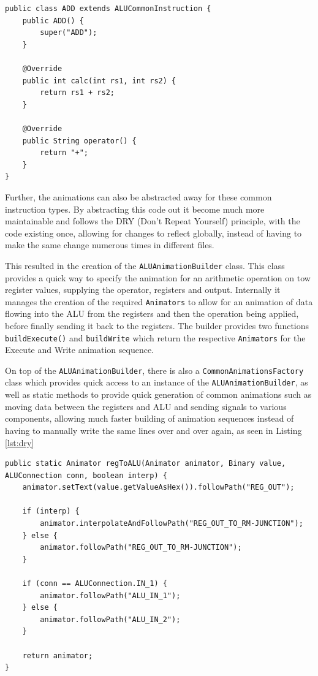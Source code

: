 \begin{lstlisting}[caption={ADD Insutrction, making useof the \texttt{ALUCommonInstruction} class}, label=lst:add_subclass]
public class ADD extends ALUCommonInstruction {
    public ADD() {
        super("ADD");
    }

    @Override
    public int calc(int rs1, int rs2) {
        return rs1 + rs2;
    }

    @Override
    public String operator() {
        return "+";
    }
}
\end{lstlisting}

Further, the animations can also be abstracted away for these common instruction types. By abstracting this code out it become much more maintainable and follows the DRY (Don't Repeat Yourself) principle, with the code existing once, allowing for changes to reflect globally, instead of having to make the same change numerous times in different files.

This resulted in the creation of the \texttt{ALUAnimationBuilder} class.  This class provides a quick way to specify the animation for an arithmetic operation on tow register values, supplying the operator, registers and output. Internally it manages the creation of the required \texttt{Animators} to allow for an animation of data flowing into the \ac{ALU} from the registers and then the operation being applied, before finally sending it back to the registers. The builder provides two functions \verb|buildExecute()| and \verb|buildWrite| which return the respective \texttt{Animators} for the Execute and Write animation sequence. 

On top of the \texttt{ALUAnimationBuilder}, there is also a \texttt{CommonAnimationsFactory} class which provides quick access to an instance of the \texttt{ALUAnimationBuilder}, as well as static methods to provide quick generation of common animations such as moving data between the registers and \ac{ALU} and sending signals to various components, allowing much faster building of animation sequences instead of having to manually write the same lines over and over again, as seen in Listing \ref{lst:dry}

\begin{lstlisting}[caption=Factory method building a more complex animation moving data from the registers to the \ac{ALU},label=lst:dry]
public static Animator regToALU(Animator animator, Binary value, ALUConnection conn, boolean interp) {
    animator.setText(value.getValueAsHex()).followPath("REG_OUT");

    if (interp) {
        animator.interpolateAndFollowPath("REG_OUT_TO_RM-JUNCTION");
    } else {
        animator.followPath("REG_OUT_TO_RM-JUNCTION");
    }

    if (conn == ALUConnection.IN_1) {
        animator.followPath("ALU_IN_1");
    } else {
        animator.followPath("ALU_IN_2");
    }

    return animator;
}
\end{lstlisting}

